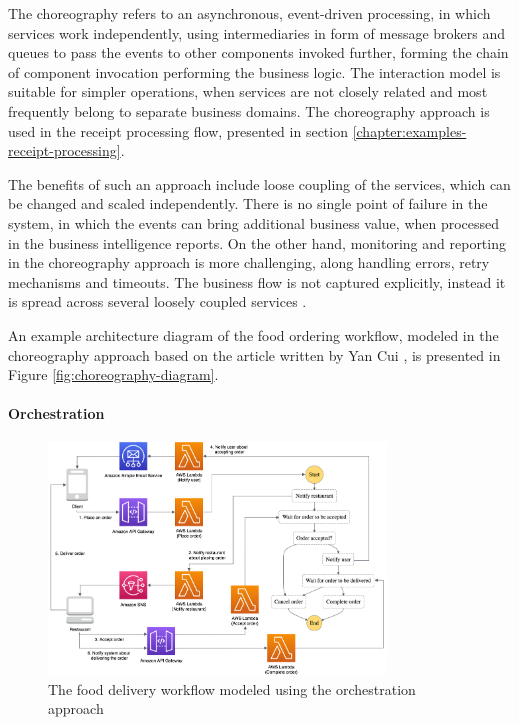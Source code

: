 The choreography refers to an asynchronous, event-driven processing, in which services work independently, using intermediaries in form of message brokers and queues to pass the events to other components invoked further, forming the chain of component invocation performing the business logic.
The interaction model is suitable for simpler operations, when services are not closely related and most frequently belong to separate business domains.
The choreography approach is used in the receipt processing flow, presented in section \ref{chapter:examples-receipt-processing}.

The benefits of such an approach include loose coupling of the services, which can be changed and scaled independently. There is no single point of failure in the system, in which the events can bring additional business value, when processed in the business intelligence reports.
On the other hand, monitoring and reporting in the choreography approach is more challenging, along handling errors, retry mechanisms and timeouts. The business flow is not captured explicitly, instead it is spread across several loosely coupled services \cite{ChoreographyVsOrchestrationInServerlessMicroservices}.

An example architecture diagram of the food ordering workflow, modeled in the choreography approach based on the article written by Yan Cui \cite{ChoreographyVsOrchestrationInTheLandOfServerless}, is presented in Figure \ref{fig:choreography-diagram}.

\paragraph{Orchestration}

\begin{figure}[]
   \centering
   \includegraphics[width=0.8\textwidth]{assets/04-serverless-for-web-apps/orchestration.png}
   \caption{The food delivery workflow modeled using the orchestration approach}
   \label{fig:orchestration-diagram}
\end{figure}

